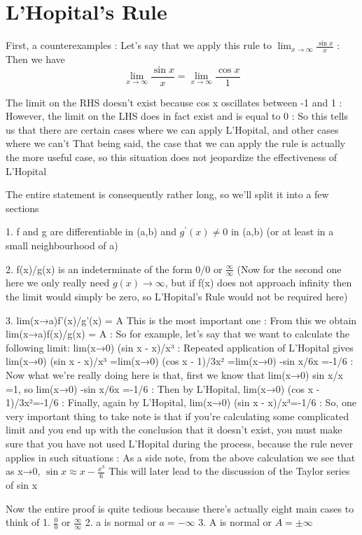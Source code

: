 \section{L'Hopital's Rule}
First, a counterexamples
:
Let's say that we apply this rule to $\lim_{x\to\infty}\frac{\sin x}{x}$
:
Then we have
\[ \lim_{x\to\infty}\frac{\sin x}{x}=\lim_{x\to\infty}\frac{\cos x}{1} \]

The limit on the RHS doesn't exist because cos x oscillates between -1 and 1
:
However, the limit on the LHS does in fact exist and is equal to 0
:
So this tells us that there are certain cases where we can apply L'Hopital, and other cases where we can't
That being said, the case that we can apply the rule is actually the more useful case, so this situation does not jeopardize the effectiveness of L'Hopital

The entire statement is consequently rather long, so we'll split it into a few sections

1. f and g are differentiable in (a,b) and $g^\prime(x)\neq0$ in (a,b) (or at least in a small neighbourhood of a)

2. f(x)/g(x) is an indeterminate of the form 0/0 or $\frac{\infty}{\infty}$ (Now for the second one here we only really need $g(x)\to\infty$, but if f(x) does not approach infinity then the limit would simply be zero, so L'Hopital's Rule would not be required here)

3. lim(x→a)f'(x)/g'(x) = A
This is the most important one
:
From this we obtain lim(x→a)f(x)/g(x) = A
:
So for example, let's say that we want to calculate the following limit:
lim(x→0) (sin x - x)/x³
:
Repeated application of L'Hopital gives
lim(x→0) (sin x - x)/x³
=lim(x→0) (cos x - 1)/3x²
=lim(x→0) -sin x/6x =-1/6
:
Now what we're really doing here is that, first we know that lim(x→0) sin x/x =1, so lim(x→0) -sin x/6x =-1/6
:
Then by L'Hopital, lim(x→0) (cos x - 1)/3x²=-1/6
:
Finally, again by L'Hopital, lim(x→0) (sin x - x)/x³=-1/6
:
So, one very important thing to take note is that if you're calculating some complicated limit and you end up with the conclusion that it doesn't exist, you must make sure that you have not used L'Hopital during the process, because the rule never applies in such situations
:
As a side note, from the above calculation we see that as x→0, $\sin x \approx x-\frac{x^3}{6}$
This will later lead to the discussion of the Taylor series of sin x

Now the entire proof is quite tedious because there's actually eight main cases to think of
1. $\frac{0}{0}$ or $\frac{\infty}{\infty}$
2. a is normal or $a=-\infty$
3. A is normal or $A=\pm\infty$

